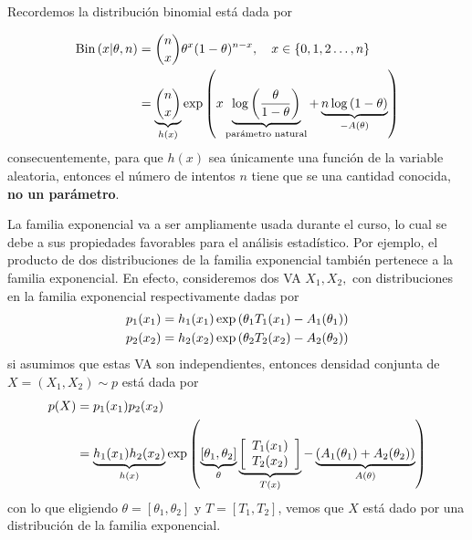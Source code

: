 \begin{example}
Recordemos la distribución binomial está dada por 

\begin{align*}
	\text{Bin}\left(x|\theta,n\right) 	&=\binom{n}{x}\theta^x(1-\theta)^{n-x},\quad x\in\{0,1,2\ldots,n\}\\
					&=
					\underbrace{\binom{n}{x}}_{h(x)}\exp\left(x\underbrace{\log\left(\frac{\theta}{1-\theta}\right)}_{\text{parámetro natural}} + \underbrace{n\log\left(1-\theta\right)}_{-{A(\theta)}}\right)\\
\end{align*}
consecuentemente, para que $h(x)$ sea únicamente una función de la variable aleatoria, entonces el número de intentos $n$ tiene que se una cantidad conocida, \textbf{no un parámetro}. 	
 \end{example} 



La familia exponencial va a ser ampliamente usada durante el curso, lo cual se debe a sus propiedades favorables para el análisis estadístico. Por ejemplo, el producto de dos distribuciones de la familia exponencial también pertenece a la familia exponencial. En efecto, consideremos dos VA $X_1,X_2,$ con distribuciones en la familia exponencial respectivamente dadas por
\begin{align}
	p_1(x_1) &= h_1(x_1)\exp\left(\theta_1T_1(x_1)-{A_1(\theta_1)}\right)\\
	p_2(x_2) &= h_2(x_2)\exp\left(\theta_2T_2(x_2)-{A_2(\theta_2)}\right)
\end{align}
si asumimos que estas VA son independientes, entonces densidad conjunta de $X=(X_1,X_2)\sim p$ está dada por
\begin{align}
	p(X) 	&= p_1(x_1) p_2(x_2) \nonumber \\ 
			&= \underbrace{h_1(x_1)h_2(x_2)}_{h(x)}\exp\left(\underbrace{[\theta_1,\theta_2]}_{\theta}\underbrace{
			\left[ \begin{array}{c}
			T_1(x_1)  \\
			T_2(x_2)  \end{array} \right]
			}_{T(x)} - \underbrace{\left(A_1(\theta_1)+A_2(\theta_2) \right)}_{A(\theta)}\right) 
\end{align}
con lo que eligiendo $\theta=[\theta_1,\theta_2]$ y $T=[T_1,T_2]$, vemos que $X$ está dado por una distribución de la familia exponencial.  

